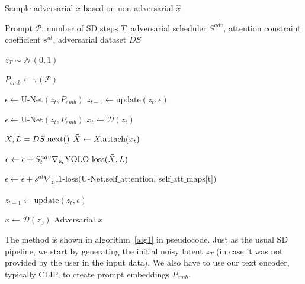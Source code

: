 \begin{algorithm}
  \caption{Sample adversarial $x$ based on non-adversarial $\hat{x}$}
  \label{alg1}
  \small
  \begin{algorithmic}
    \REQUIRE Prompt $\mathcal{P}$, number of SD steps $T$, adversarial scheduler $S^{adv}$, attention constraint coefficient $s^{at}$, adversarial dataset $DS$

    \STATE $z_T \sim \mathcal{N}(0, 1)$\hspace{2.38cm}
    
    \STATE $P_{emb} \gets \tau(\mathcal{P})$\hspace{2.5cm}

        \quad
        \STATE $\epsilon \gets \text{U-Net}(z_t, P_{emb})$
        \STATE $z_{t - 1} \gets \text{update}(z_t, \epsilon)$
    \ENDFOR

        \STATE $\epsilon \gets \text{U-Net}(z_t, P_{emb})$
        \STATE $x_t \gets \mathcal{D}(z_t)$\hspace{2.32cm}

	\STATE $X, L = DS\text{.next\hspace{0.05cm}}()$
        \STATE $\Tilde{X} \gets X.\text{attach}(x_t)$\hspace{1.3cm}

        \STATE $\epsilon \gets \epsilon + S^{adv}_t\nabla_{z_t}\text{YOLO-loss}(\Tilde{X}, L)$\hspace{4.127cm}

        \STATE $\epsilon \gets \epsilon + s^{at}\nabla_{z_t}\text{l1-loss(U-Net.self\_attention, self\_att\_maps[t])}$\quad

        \STATE $z_{t - 1} \gets \text{update}(z_t, \epsilon)$
    \ENDFOR

    \STATE $x \gets \mathcal{D}(z_0)$
    \ENSURE Adversarial $x$
  \end{algorithmic}
\end{algorithm}

The method is shown in algorithm~\ref{alg1} in pseudocode. 
Just as the usual SD pipeline, we start by generating the initial noisy latent $z_T$ (in case it was not provided by the user in the input data).
We also have to use our text encoder, typically CLIP, to create prompt embeddings $P_{emb}$.

